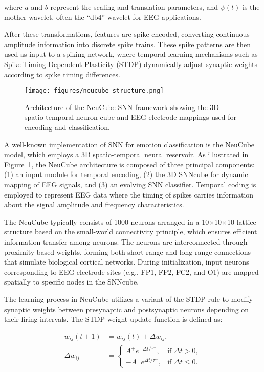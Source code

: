 \documentclass[conference]{IEEEtran}
\begin{document}
where \(a\) and \(b\) represent the scaling and translation parameters, and \(\psi(t)\) is the mother wavelet, often the “db4” wavelet for EEG applications.

After these transformations, features are spike-encoded, converting continuous amplitude information into discrete spike trains. These spike patterns are then used as input to a spiking network, where temporal learning mechanisms such as Spike-Timing-Dependent Plasticity (STDP) \cite{Luo2020SNN_EEGEmotion} dynamically adjust synaptic weights according to spike timing differences.

\begin{figure}[H]
    \centering
    \texttt{[image: figures/neucube\_structure.png]}
    \caption{Architecture of the NeuCube SNN framework showing the 3D spatio-temporal neuron cube and EEG electrode mappings used for encoding and classification.}
    \label{fig:neucube_structure}
\end{figure}

A well-known implementation of SNN for emotion classification is the NeuCube model, which employs a 3D spatio-temporal neural reservoir. As illustrated in Figure~\ref{fig:neucube_structure}, the NeuCube architecture is composed of three principal components: (1) an input module for temporal encoding, (2) the 3D SNNcube for dynamic mapping of EEG signals, and (3) an evolving SNN classifier. Temporal coding is employed to represent EEG data where the timing of spikes carries information about the signal amplitude and frequency characteristics.

The NeuCube typically consists of 1000 neurons arranged in a 10×10×10 lattice structure based on the small-world connectivity principle, which ensures efficient information transfer among neurons. The neurons are interconnected through proximity-based weights, forming both short-range and long-range connections that simulate biological cortical networks. During initialization, input neurons corresponding to EEG electrode sites (e.g., FP1, FP2, FC2, and O1) are mapped spatially to specific nodes in the SNNcube.

The learning process in NeuCube utilizes a variant of the STDP rule to modify synaptic weights between presynaptic and postsynaptic neurons depending on their firing intervals. The STDP weight update function is defined as:

\begin{equation}
\begin{aligned}
w_{ij}(t + 1) &= w_{ij}(t) + \Delta w_{ij}, \\
\Delta w_{ij} &=
\begin{cases}
A^+ e^{-\Delta t / \tau^+}, & \text{if } \Delta t > 0, \\
-A^- e^{\Delta t / \tau^-}, & \text{if } \Delta t \leq 0.
\end{cases}
\end{aligned}
\end{equation}
\end{document}
